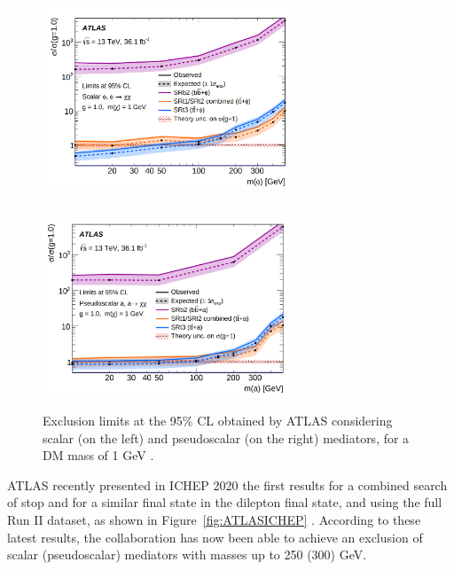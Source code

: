\documentclass[a4paper, 10pt, openright]{report}
\begin{document}
\begin{figure}[htbp]
\centering
\begin{minipage}[b]{.4\textwidth}
\includegraphics[width=7.5cm, height=6.2cm]{figs/Atlas36a.png}
\end{minipage}\hfill
\begin{minipage}[b]{.48\textwidth}
\includegraphics[width=7.5cm, height=6.02cm]{figs/Atlas36b.png}
\end{minipage}\hfill
\caption{Exclusion limits at the 95\% \ac{CL} obtained by \ac{ATLAS} considering  scalar (on the left) and pseudoscalar (on the right) mediators, for a \ac{DM} mass of 1 GeV \cite{PreviousDoubleTopBottomAllLep13ATLAS}.}\label{fig:atlas36}
\end{figure}

\ac{ATLAS} recently presented in ICHEP 2020 the first results for a combined search of stop and for a similar final state in the dilepton final state, and using the full Run II dataset, as shown in Figure~\ref{fig:ATLASICHEP} \cite{ATLASICHEP2020}. According to these latest results, the collaboration has now been able to achieve an exclusion of scalar (pseudoscalar) mediators with masses up to 250 (300) GeV.
\end{document}
